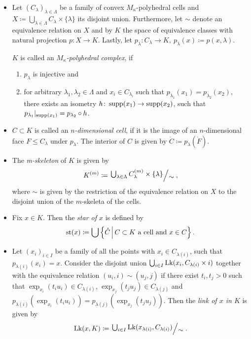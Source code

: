 \begin{defin}\ 
  \begin{itemize}
  \item Let \((C_\lambda)_{\lambda \in \Lambda}\) be a family of convex \(M_\kappa\)-polyhedral cells and \(X \coloneqq \bigcup_{\lambda \in \Lambda} C_\lambda \times \{\lambda\}\) its disjoint union. Furthermore, let \(\sim\) denote an equivalence relation on \(X\) and by \(K\) the space of equivalence classes with natural projection \(p \colon X \to K\). Lastly, let \(p_\lambda \colon C_\lambda \to K,\ p_\lambda(x) \coloneqq p(x, \lambda)\).

    \(K\) is called an \emph{\(M_\kappa\)-polyhedral complex}, if
    \begin{enumerate}
    \item \(p_\lambda\) is injective and
    \item for arbitrary \(\lambda_1, \lambda_2 \in \Lambda\) and \(x_i \in C_{\lambda_i}\) such that \(p_{\lambda_1}(x_1) = p_{\lambda_2}(x_2)\), there exists an isometry \(h\colon \operatorname{supp}(x_1) \to \operatorname{supp}(x_2)\), such that \(p_{\lambda_1}|_{\operatorname{supp}(x_1)} = p_{\lambda_2} \circ h\).
    \end{enumerate}
  \item \(C \subset K\) is called an \emph{\(n\)-dimensional cell}, if it is the image of an \(n\)-dimensional face \(F \leq C_\lambda\) under \(p_\lambda\). The interior of \(C\) is given by \(\mathring C \coloneqq p_\lambda(\mathring F)\).
  \item The \emph{m-skeleton} of \(K\) is given by
    \begin{align*}
      K^{(m)} \coloneqq \quot{\bigcup_{\lambda \in \Lambda} C_\lambda^{(m)} \times \{\lambda\}}{\sim},
    \end{align*}
    where \(\sim\) is given by the restriction of the equivalence relation on \(X\) to the disjoint union of the \(m\)-skeleta of the cells.

  \item Fix \(x \in K\). Then the \emph{star of \(x\)} is defined by
    \begin{align*}
      \operatorname{st}(x) \coloneqq \bigcup \left\{\mathring C \,\middle|\, C \subset K \text{ a cell and } x \in C\right\}.
    \end{align*}
  \item Let \((x_i)_{i \in I}\) be a family of all the points with \(x_i \in C_{\lambda(i)}\), such that \(p_{\lambda(i)}(x_i) = x\). Consider the disjoint union \(\bigcup_{i \in I} \operatorname{Lk}(x_i, C_{\lambda(i)} \times {i})\) together with the equivalence relation \((u_i, i) \sim (u_j, j)\) if there exist \(t_i, t_j > 0\) such that \(\exp_{x_i}(t_i u_i) \in C_{\lambda(i)}\), \(\exp_{x_j}(t_j u_j) \in C_{\lambda(j)}\) and \(p_{\lambda(i)}(\exp_{x_i}(t_i u_i)) = p_{\lambda(j)}(\exp_{x_j}(t_j u_j))\). Then the \emph{link of \(x\) in \(K\)} is given by
    \begin{align*}
      \lk(x, K) \coloneqq \quot{\bigcup_{i \in I} \lk(x_{\lambda(i)}, C_{\lambda(i)})}{\sim}.
    \end{align*}
  \end{itemize}
\end{defin}

